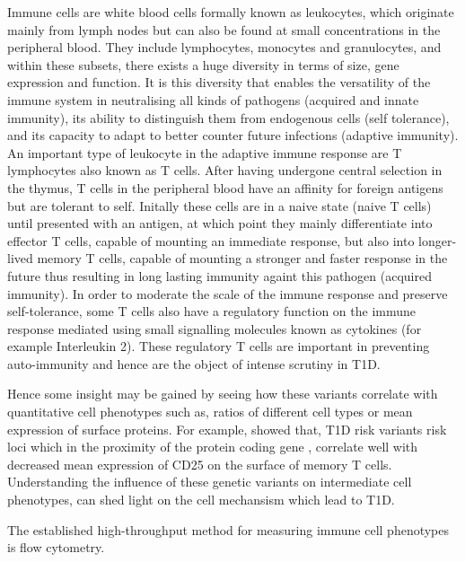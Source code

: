 Immune cells are white blood cells formally known as leukocytes, which originate mainly from lymph nodes but can also be found at small concentrations in the peripheral blood.
They include lymphocytes, monocytes and granulocytes, and within these subsets, there exists a huge diversity in terms of size, gene expression and function.
It is this diversity that enables the versatility of the immune system in neutralising all kinds of pathogens (acquired and innate immunity),
its ability to distinguish them from endogenous cells (self tolerance),
and its capacity to adapt to better counter future infections (adaptive immunity).
An important type of leukocyte in the adaptive immune response are T lymphocytes also known as T cells.
After having undergone central selection in the thymus,
T cells in the peripheral blood have an affinity for foreign antigens but are tolerant to self.
Initally these cells are in a naive state (naive T cells) until presented with an antigen,
at which point they mainly differentiate into effector T cells, capable of mounting an immediate response,
but also into longer-lived memory T cells, capable of mounting a stronger and faster response in the future thus
resulting in long lasting immunity againt this pathogen (acquired immunity).
In order to moderate the scale of the immune response and preserve self-tolerance, some T cells also have a regulatory function on the immune response
mediated using small signalling molecules known as cytokines (for example Interleukin 2).
These regulatory T cells are important in preventing auto-immunity and hence are the object of intense scrutiny in T1D.

Hence some insight may be gained by seeing how these variants correlate with quantitative cell phenotypes such as, 
ratios of different cell types or mean expression of surface proteins.
For example, \citet{Dendrou:2009dv} showed that, T1D risk variants risk loci which in the proximity of the protein coding gene ,
correlate well with decreased mean expression of CD25 on the surface of memory T cells.
Understanding the influence of these genetic variants on intermediate cell phenotypes, can shed light on the cell mechansism which lead to T1D.

The established high-throughput method for measuring immune cell phenotypes is flow cytometry.

